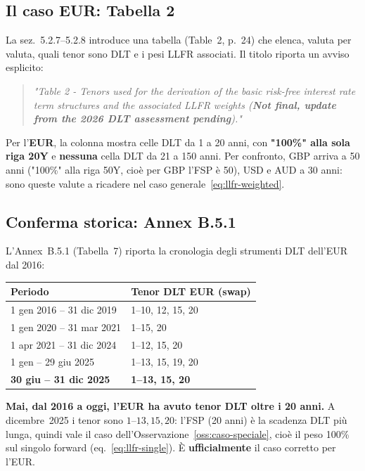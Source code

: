 \documentclass[11pt,a4paper]{article}
\theoremstyle{definition}
\theoremstyle{remark}
\begin{document}
\subsection{Il caso EUR: Tabella 2}
\label{sec:tabella2}

La sez.~5.2.7--5.2.8 introduce una tabella (Table~2, p.~24) che elenca, valuta per valuta,
quali tenor sono DLT e i pesi LLFR associati. Il titolo riporta un avviso esplicito:
\begin{quote}
\textit{"Table 2 - Tenors used for the derivation of the basic risk-free interest rate term
structures and the associated LLFR weights (\textbf{Not final, update from the 2026 DLT
assessment pending})."}
\end{quote}
Per l'\textbf{EUR}, la colonna mostra celle DLT da 1 a 20 anni, con \textbf{"100\%" alla sola
riga 20Y} e \textbf{nessuna} cella DLT da 21 a 150 anni. Per confronto, GBP arriva a 50 anni
("100\%" alla riga 50Y, cio\`e per GBP l'FSP \`e 50), USD e AUD a 30 anni: sono queste valute
a ricadere nel caso generale~\eqref{eq:llfr-weighted}.

\subsection{Conferma storica: Annex B.5.1}
\label{sec:annexB}

L'Annex~B.5.1 (Tabella~7) riporta la cronologia degli strumenti DLT dell'EUR dal 2016:

\begin{center}\small
\renewcommand{\arraystretch}{1.15}
\begin{tabular}{ll}
\toprule
\textbf{Periodo} & \textbf{Tenor DLT EUR (swap)} \\
\midrule
1 gen 2016 -- 31 dic 2019 & 1--10, 12, 15, 20 \\
1 gen 2020 -- 31 mar 2021 & 1--15, 20 \\
1 apr 2021 -- 31 dic 2024 & 1--12, 15, 20 \\
1 gen -- 29 giu 2025 & 1--13, 15, 19, 20 \\
\rowcolor{rowtint} \textbf{30 giu -- 31 dic 2025} & \textbf{1--13, 15, 20} \\
\bottomrule
\end{tabular}
\end{center}

\textbf{Mai, dal 2016 a oggi, l'EUR ha avuto tenor DLT oltre i 20 anni.} A dicembre~2025 i
tenor sono $1$--$13,15,20$: l'FSP (20 anni) \`e la scadenza DLT pi\`u lunga, quindi vale il
caso dell'Osservazione~\ref{oss:caso-speciale}, cio\`e il peso 100\% sul singolo forward
(eq.~\eqref{eq:llfr-single}). \`E \textbf{ufficialmente} il caso corretto per l'EUR.
\end{document}
